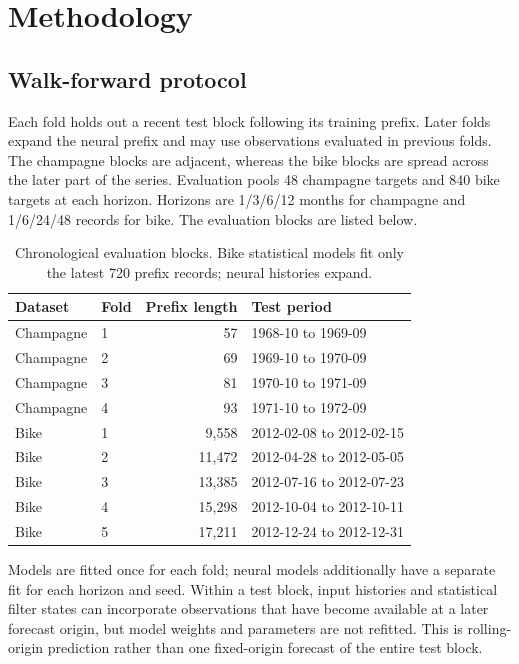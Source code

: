 \documentclass[10pt,a4paper]{article}
\begin{document}
\section{Methodology}
\subsection{Walk-forward protocol}
Each fold holds out a recent test block following its training prefix. Later folds expand the neural prefix and may use observations evaluated in previous folds. The champagne blocks are adjacent, whereas the bike blocks are spread across the later part of the series. Evaluation pools 48 champagne targets and 840 bike targets at each horizon. Horizons are 1/3/6/12 months for champagne and 1/6/24/48 records for bike. The evaluation blocks are listed below.
\begin{table}[htbp]\centering\footnotesize\caption{Chronological evaluation blocks. Bike statistical models fit only the latest 720 prefix records; neural histories expand.}\begin{tabular}{@{}llrl@{}}\toprule Dataset & Fold & Prefix length & Test period\\\midrule Champagne & 1 & 57 & 1968-10 to 1969-09 \\
Champagne & 2 & 69 & 1969-10 to 1970-09 \\
Champagne & 3 & 81 & 1970-10 to 1971-09 \\
Champagne & 4 & 93 & 1971-10 to 1972-09 \\
Bike & 1 & 9,558 & 2012-02-08 to 2012-02-15 \\
Bike & 2 & 11,472 & 2012-04-28 to 2012-05-05 \\
Bike & 3 & 13,385 & 2012-07-16 to 2012-07-23 \\
Bike & 4 & 15,298 & 2012-10-04 to 2012-10-11 \\
Bike & 5 & 17,211 & 2012-12-24 to 2012-12-31 \\\bottomrule\end{tabular}\end{table}

Models are fitted once for each fold; neural models additionally have a separate fit for each horizon and seed. Within a test block, input histories and statistical filter states can incorporate observations that have become available at a later forecast origin, but model weights and parameters are not refitted. This is rolling-origin prediction rather than one fixed-origin forecast of the entire test block.
\end{document}
